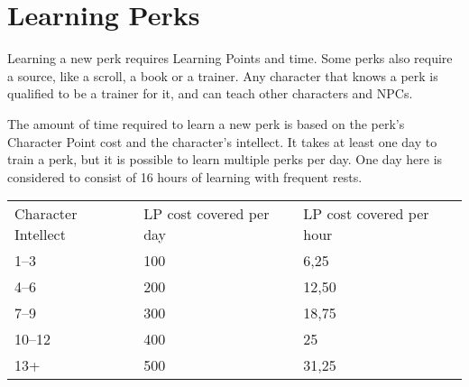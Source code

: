 \section{Learning Perks}\label{sec:learningPerks}
Learning a new perk requires Learning Points and time.
Some perks also require a source, like a scroll, a book or a trainer.
Any character that knows a perk is qualified to be a trainer for it, and can teach other characters and NPCs.

The amount of time required to learn a new perk is based on the perk's Character Point cost and the character's intellect.
It takes at least one day to train a perk, but it is possible to learn multiple perks per day.
One day here is considered to consist of 16 hours of learning with frequent rests.\\

\begin{tabular}{l | l | l}
	Character Intellect & LP cost covered per day & LP cost covered per hour\\
	1--3 & 100 & 6,25\\
	4--6 & 200 & 12,50\\
	7--9 & 300 & 18,75\\
	10--12 & 400 & 25\\
	13+ & 500 & 31,25
\end{tabular}